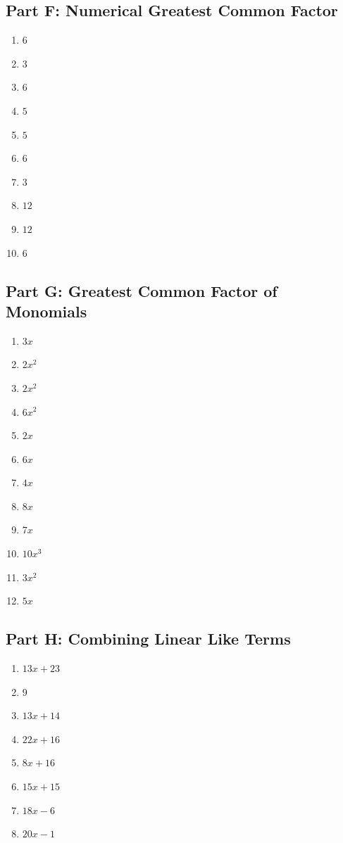 \documentclass[11pt]{article}
\begin{document}
\subsection*{Part F: Numerical Greatest Common Factor}
\begin{multicols}{3}
\begin{enumerate}
  \item $6$
  \item $3$
  \item $6$
  \item $5$
  \item $5$
  \item $6$
  \item $3$
  \item $12$
  \item $12$
  \item $6$
\end{enumerate}
\end{multicols}
\subsection*{Part G: Greatest Common Factor of Monomials}
\begin{multicols}{3}
\begin{enumerate}
  \item $3 x$
  \item $2 x^{2}$
  \item $2 x^{2}$
  \item $6 x^{2}$
  \item $2 x$
  \item $6 x$
  \item $4 x$
  \item $8 x$
  \item $7 x$
  \item $10 x^{3}$
  \item $3 x^{2}$
  \item $5 x$
\end{enumerate}
\end{multicols}
\subsection*{Part H: Combining Linear Like Terms}
\begin{multicols}{3}
\begin{enumerate}
  \item $13 x + 23$
  \item $9$
  \item $13 x + 14$
  \item $22 x + 16$
  \item $8 x + 16$
  \item $15 x + 15$
  \item $18 x - 6$
  \item $20 x - 1$
\end{enumerate}
\end{multicols}
\end{document}
